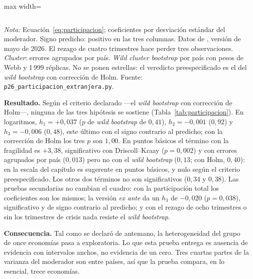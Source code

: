 \begin{table}[htbp]
\begin{adjustbox}{max width=\linewidth}
\begin{tabular}{l ccc}
\bottomrule
\end{tabular}
\end{adjustbox}
\par\smallskip\parbox{0.95\linewidth}{\footnotesize \textit{Nota:} Ecuación~\eqref{eq:participacion}; coeficientes por desviación estándar del moderador. Signo predicho: positivo en las tres columnas. Datos de \citet{ArslanalpTsuda2014}, versión de mayo de 2026. El rezago de cuatro trimestres hace perder tres observaciones. \textit{Cluster}: errores agrupados por país. \textit{Wild cluster bootstrap} por país con pesos de Webb y 1\,999 réplicas. No se ponen estrellas: el veredicto preespecificado es el del \textit{wild bootstrap} con corrección de Holm. Fuente: \texttt{p26\_participacion\_extranjera.py}.}
\end{table}

\textbf{Resultado.} Según el criterio declarado ---el \textit{wild bootstrap} con corrección de Holm---, ninguna de las tres hipótesis se sostiene (Tabla~\ref{tab:participacion}). En logaritmos, $h_1=+0{,}037$ ($p$ de \textit{wild bootstrap} de $0{,}41$), $h_2=-0{,}001$ ($0{,}92$) y $h_3=-0{,}006$ ($0{,}48$), este último con el signo contrario al predicho; con la corrección de Holm los tres $p$ son $1{,}00$. En puntos básicos el término con la fragilidad es $+3{,}38$, significativo con Driscoll--Kraay ($p=0{,}002$) y con errores agrupados por país ($0{,}013$) pero no con el \textit{wild bootstrap} ($0{,}13$; con Holm, $0{,}40$): en la escala del capítulo es sugerente en puntos básicos, y nulo según el criterio preespecificado. Los otros dos términos no son significativos ($0{,}34$ y $0{,}38$). Las pruebas secundarias no cambian el cuadro: con la participación total los coeficientes son los mismos; la versión \textit{ex ante} da un $h_3$ de $-0{,}020$ ($p=0{,}038$), significativo y de signo contrario al predicho; y con el rezago de ocho trimestres o sin los trimestres de crisis nada resiste el \textit{wild bootstrap}.

\textbf{Consecuencia.} Tal como se declaró de antemano, la heterogeneidad del grupo de once economías pasa a exploratoria. Lo que esta prueba entrega es ausencia de evidencia con intervalos anchos, no evidencia de un cero. Tres cuartas partes de la varianza del moderador son entre países, así que la prueba compara, en lo esencial, trece economías.



